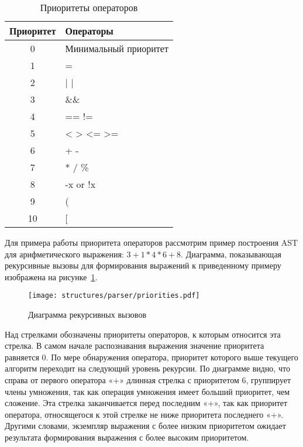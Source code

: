 \begin{table}[h!]
    \Large
    \centering
    \begin{threeparttable}
        \caption{Приоритеты операторов}
        \label{t:operator_priority}
        \begin{tabularx}{\textwidth}{|c|X|}
            \hline
            Приоритет & Операторы             \\
            \hline
            0         & Минимальный приоритет \\
            \hline
            1         & =                     \\
            \hline
            2         & | |                   \\
            \hline
            3         & \&\&                  \\
            \hline
            4         & == !=                 \\
            \hline
            5         & < > <= >=             \\
            \hline
            6         & + -                   \\
            \hline
            7         & * / \%                \\
            \hline
            8         & -x or !x              \\
            \hline
            9         & (                     \\
            \hline
            10        & [                     \\
            \hline
        \end{tabularx}
    \end{threeparttable}
    \vspace{\bottompaddingoftable}
\end{table}

Для примера работы приоритета операторов рассмотрим пример построения AST для арифметического выражения: $3 + 1 * 4 * 6 + 8$.
Диаграмма, показывающая рекурсивные вызовы для формирования выражений к приведенному примеру изображена на рисунке~\ref{f:priorities}.

\begin{figure}[ht]
	\centering
	\vspace{\toppaddingoffigure}
	\texttt{[image: structures/parser/priorities.pdf]}
	\caption{Диаграмма рекурсивных вызовов}
	\label{f:priorities}
\end{figure}

Над стрелками обозначены приоритеты операторов, к которым относится эта стрелка.
В самом начале распознавания выражения значение приоритета равняется 0.
По мере обнаружения оператора, приоритет которого выше текущего алгоритм переходит на следующий уровень рекурсии.
По диаграмме видно, что справа от первого оператора «+» длинная стрелка с приоритетом 6, группирует члены умножения, так как операция умножения имеет больший приоритет, чем сложение.
Эта стрелка заканчивается перед последним «+», так как приоритет оператора, относящегося к этой стрелке не ниже приоритета последнего «+».
Другими словами, экземпляр выражения с более низким приоритетом ожидает результата формирования выражения с более высоким приоритетом.

